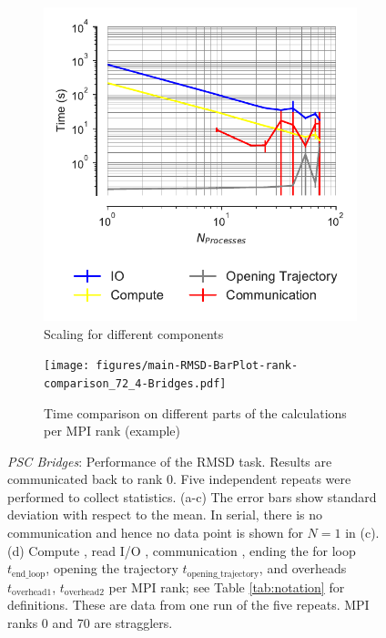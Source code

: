 \begin{figure}[!htb]
  \begin{subfigure}{.4\textwidth}
    \includegraphics[width=\linewidth]{figures/main-RMSD-time_comp_IO_comparison-Bridges.pdf}
    \captionsetup{format=hang}
    \caption{Scaling for different components}
    \label{fig:ScalingComputeIO-Bridges}
  \end{subfigure}
  \hfill
  \begin{subfigure} {.5\textwidth}
    \texttt{[image: figures/main-RMSD-BarPlot-rank-comparison\_72\_4-Bridges.pdf]}
    \captionsetup{format=hang}
    \caption{Time comparison on different parts of the calculations per MPI rank (example)}
    \label{fig:MPIranks-Bridges}
  \end{subfigure}
  \caption{\emph{PSC Bridges}: Performance of the RMSD task.
    Results are communicated back to rank 0.
    Five independent repeats were performed to collect statistics.
    (a-c) The error bars show standard deviation with respect to the mean.
    In serial, there is no communication and hence no data point is shown for $N=1$ in (c).
    (d) Compute \tcomp, read I/O \tIO, communication \tcomm, ending the for loop $t_{\text{end\_loop}}$, opening the trajectory $t_{\text{opening\_trajectory}}$, and overheads $t_{\text{overhead1}}$, $t_{\text{overhead2}}$ per MPI rank; see Table \ref{tab:notation} for definitions.
    These are data from one run of the five repeats.
    MPI ranks 0 and 70 are stragglers.
  }
\label{fig:MPIwithIO-Bridges}
\end{figure} 



